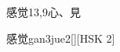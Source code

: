 \begin{entry}{感觉}{13,9}{⼼、⾒}
  \begin{phonetics}{感觉}{gan3jue2}[][HSK 2]
  \end{phonetics}
\end{entry}
